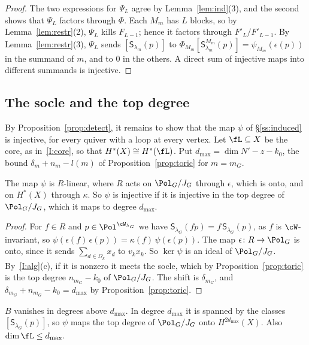 \documentclass[11pt]{amsart}
\begin{document}
\begin{proof}
The two expressions for $\Psi_L$ agree by Lemma~\ref{lem:ind}(3), and the
second shows that $\Psi_L$ factors through $\Phi$.  Each $M_m$ has $L$ blocks,
so by Lemma~\ref{lem:restr}(2), $\Psi_L$ kills $F_{L-1}$; hence it factors
through $F'_L/F'_{L-1}$.  By Lemma~\ref{lem:restr}(3), $\Psi_L$ sends $[\mathsf
S_{\lambda_m}(p)]$ to $\Phi_{M_m}[\mathsf S^{M_m}_{\lambda_m}(p)]=\psi_{M_m}(\epsilon(p))$
in the summand of $m$, and to $0$ in the others.  A direct sum of injective
maps into different summands is injective.
\end{proof}

\subsection{The socle and the top degree}\label{ss:top}
By Proposition~\ref{prop:detect}, it remains to show that the map $\psi$ of
\S\ref{ss:induced} is injective, for every quiver with a loop at every vertex.
Let $\fL\subseteq X$ be the core, as in~\ref{I:core}, so that
$H^*(X)\cong H^*(\fL)$.  Put $d_{\max}=\dim N'-z-k_0$, the bound
$\delta_m+n_m-l(m)$ of Proposition~\ref{prop:toric} for $m=m_G$.

\begin{lemma}[socle]\label{lem:socle}
The map $\psi$ is $R$-linear, where $R$ acts on $\Pol_G/J_G$ through
$\epsilon$, which is onto, and on $H^*(X)$ through $\kappa$.  So $\psi$ is
injective if it is injective in the top degree of $\Pol_G/J_G$, which it maps
to degree $d_{\max}$.
\end{lemma}

\begin{proof}
For $f\in R$ and $p\in\Pol^{\cW_{\lambda_G}}$ we have $\mathsf
S_{\lambda_G}(fp)=f\,\mathsf S_{\lambda_G}(p)$, as $f$ is $\cW$-invariant, so
$\psi(\epsilon(f)\,\epsilon(p))=\kappa(f)\,\psi(\epsilon(p))$.  The map
$\epsilon\colon R\to\Pol_G$ is onto, since it sends $\sum_{d\in\Omega_k}x_d$ to
$v_kx_k$.  So $\ker\psi$ is an ideal of $\Pol_G/J_G$.  By~\ref{I:alg}(c), if
it is nonzero it meets the socle, which by Proposition~\ref{prop:toric} is the
top degree $n_{m_G}-k_0$ of $\Pol_G/J_G$.  The shift is $\delta_{m_G}$, and
$\delta_{m_G}+n_{m_G}-k_0=d_{\max}$ by Proposition~\ref{prop:toric}.
\end{proof}

\begin{proposition}\label{prop:top}
$B$ vanishes in degrees above $d_{\max}$.  In degree $d_{\max}$ it is
spanned by the classes $[\mathsf S_{\lambda_G}(p)]$, so $\psi$ maps the top
degree of $\Pol_G/J_G$ onto $H^{2d_{\max}}(X)$.  Also $\dim\fL\le d_{\max}$.
\end{proposition}
\end{document}
